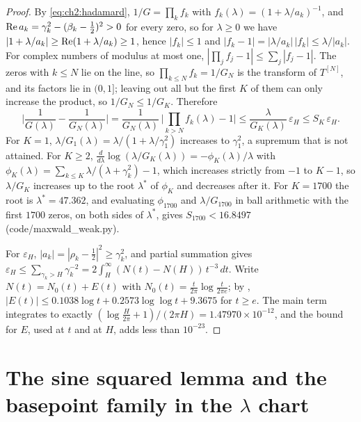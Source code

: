 \begin{proof}
By \eqref{eq:ch2:hadamard}, $1/G=\prod_kf_k$ with $f_k(\lambda)=(1+\lambda/a_k)^{-1}$, and $\operatorname{Re} a_k=\gamma_k^2-(\beta_k-\frac12)^2>0$ for every zero, so for $\lambda\ge0$ we have $|1+\lambda/a_k|\ge\operatorname{Re}(1+\lambda/a_k)\ge1$, hence $|f_k|\le1$ and $|f_k-1|=|\lambda/a_k|\,|f_k|\le\lambda/|a_k|$. For complex numbers of modulus at most one, $|\prod_jf_j-1|\le\sum_j|f_j-1|$. The zeros with $k\le N$ lie on the line, so $\prod_{k\le N}f_k=1/G_N$ is the transform of $T^{[N]}$, and its factors lie in $(0,1]$; leaving out all but the first $K$ of them can only increase the product, so $1/G_N\le1/G_K$. Therefore
\[
\Big|\frac1{G(\lambda)}-\frac1{G_N(\lambda)}\Big|=\frac1{G_N(\lambda)}\,\Big|\prod_{k>N}f_k(\lambda)-1\Big|\le\frac{\lambda}{G_K(\lambda)}\,\varepsilon_H\le S_K\,\varepsilon_H.
\]
For $K=1$, $\lambda/G_1(\lambda)=\lambda/(1+\lambda/\gamma_1^2)$ increases to $\gamma_1^2$, a supremum that is not attained. For $K\ge2$, $\frac d{d\lambda}\log(\lambda/G_K(\lambda))=-\phi_K(\lambda)/\lambda$ with $\phi_K(\lambda)=\sum_{k\le K}\lambda/(\lambda+\gamma_k^2)-1$, which increases strictly from $-1$ to $K-1$, so $\lambda/G_K$ increases up to the root $\lambda^*$ of $\phi_K$ and decreases after it. For $K=1700$ the root is $\lambda^*=47.362$, and evaluating $\phi_{1700}$ and $\lambda/G_{1700}$ in ball arithmetic with the first $1700$ zeros, on both sides of $\lambda^*$, gives $S_{1700}<16.8497$ (code/maxwald\_weak.py).

For $\varepsilon_H$, $|a_k|=|\rho_k-\frac12|^2\ge\gamma_k^2$, and partial summation gives $\varepsilon_H\le\sum_{\gamma_k>H}\gamma_k^{-2}=2\int_H^\infty(N(t)-N(H))\,t^{-3}\,dt$. Write $N(t)=N_0(t)+E(t)$ with $N_0(t)=\frac t{2\pi}\log\frac t{2\pi e}$; by \cite[Corollary~1.2]{HSW22}, $|E(t)|\le0.1038\log t+0.2573\log\log t+9.3675$ for $t\ge e$. The main term integrates to exactly $(\log\frac H{2\pi}+1)/(2\pi H)=1.47970\times10^{-12}$, and the bound for $E$, used at $t$ and at $H$, adds less than $10^{-23}$.
\end{proof}

\section{The sine squared lemma and the basepoint family in the \texorpdfstring{$\lambda$}{lambda} chart}\label{mw:sec:basepoint}

